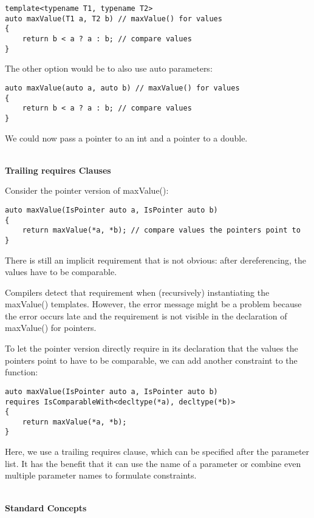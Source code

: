 \begin{lstlisting}[style=styleCXX]
template<typename T1, typename T2>
auto maxValue(T1 a, T2 b) // maxValue() for values
{
	return b < a ? a : b; // compare values
}
\end{lstlisting}

The other option would be to also use auto parameters:

\begin{lstlisting}[style=styleCXX]
auto maxValue(auto a, auto b) // maxValue() for values
{
	return b < a ? a : b; // compare values
}
\end{lstlisting}

We could now pass a pointer to an int and a pointer to a double.

\noindent
\hspace*{\fill} \\ %
\textbf{Trailing requires Clauses}

Consider the pointer version of maxValue():

\begin{lstlisting}[style=styleCXX]
auto maxValue(IsPointer auto a, IsPointer auto b)
{
	return maxValue(*a, *b); // compare values the pointers point to
}
\end{lstlisting}

There is still an implicit requirement that is not obvious: after dereferencing, the values have to be comparable.

Compilers detect that requirement when (recursively) instantiating the maxValue() templates. However, the error message might be a problem because the error occurs late and the requirement is not visible in the declaration of maxValue() for pointers.

To let the pointer version directly require in its declaration that the values the pointers point to have to be comparable, we can add another constraint to the function:

\begin{lstlisting}[style=styleCXX]
auto maxValue(IsPointer auto a, IsPointer auto b)
requires IsComparableWith<decltype(*a), decltype(*b)>
{
	return maxValue(*a, *b);
}
\end{lstlisting}

Here, we use a trailing requires clause, which can be specified after the parameter list. It has the benefit that it can use the name of a parameter or combine even multiple parameter names to formulate constraints.

\noindent
\hspace*{\fill} \\ %
\textbf{Standard Concepts}

